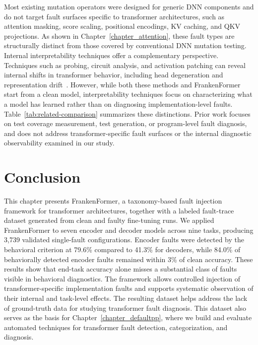 Most existing mutation operators were designed for generic DNN components and do not target fault surfaces specific to transformer architectures, such as attention masking, score scaling, positional encodings, KV caching, and QKV projections. As shown in Chapter~\ref{chapter_attention}, these fault types are structurally distinct from those covered by conventional DNN mutation testing. Internal interpretability techniques offer a complementary perspective. Techniques such as probing, circuit analysis, and activation patching can reveal internal shifts in transformer behavior, including head degeneration and representation drift~\citep{clark2019does,voita2019analyzing}. However, while both these methods and FrankenFormer start from a clean model, interpretability techniques focus on characterizing what a model has learned rather than on diagnosing implementation-level faults. Table~\ref{tab:related-comparison} summarizes these distinctions. Prior work focuses on test coverage measurement, test generation, or program-level fault diagnosis, and does not address transformer-specific fault surfaces or the internal diagnostic observability examined in our study.

\section{Conclusion}
\label{sec:frankformer-summary}

This chapter presents FrankenFormer, a taxonomy-based fault injection framework for transformer architectures, together with a labeled fault-trace dataset generated from clean and faulty fine-tuning runs. We applied FrankenFormer to seven encoder and decoder models across nine tasks, producing 3{,}739 validated single-fault configurations. Encoder faults were detected by the behavioral criterion at 79.6\% compared to 41.3\% for decoders, while 84.0\% of behaviorally detected encoder faults remained within 3\% of clean accuracy. These results show that end-task accuracy alone misses a substantial class of faults visible in behavioral diagnostics. The framework allows controlled injection of transformer-specific implementation faults and supports systematic observation of their internal and task-level effects. The resulting dataset helps address the lack of ground-truth data for studying transformer fault diagnosis. This dataset also serves as the basis for Chapter~\ref{chapter_defaultpp}, where we build and evaluate automated techniques for transformer fault detection, categorization, and diagnosis.
